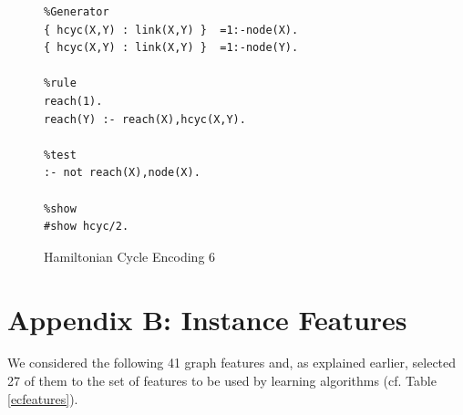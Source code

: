 \documentclass{new_tlp}
\begin{document}
\begin{figure}[!h]
\figrule
\begin{center}
\begin{verbatim}
%Generator
{ hcyc(X,Y) : link(X,Y) }  =1:-node(X).
{ hcyc(X,Y) : link(X,Y) }  =1:-node(Y).

%rule
reach(1).
reach(Y) :- reach(X),hcyc(X,Y).

%test
:- not reach(X),node(X).

%show
#show hcyc/2.
\end{verbatim}
\end{center}
\figrule
\caption{Hamiltonian Cycle Encoding 6}\label{enc6}
\end{figure}

\newpage
\section*{Appendix B: Instance Features}\label{appB}

We considered the following 41 graph features and, as explained earlier, 
selected 27 of them to the set of features to be used by learning 
algorithms (cf. Table \ref{ecfeatures}).
\end{document}
